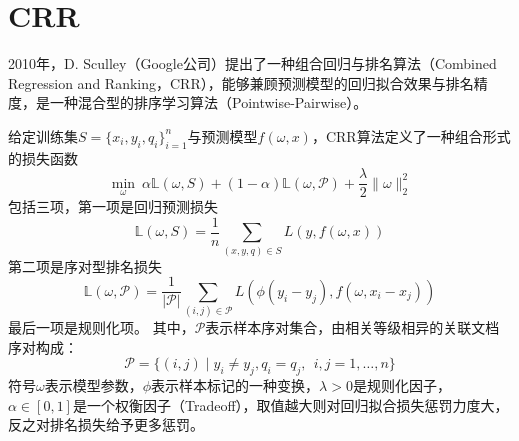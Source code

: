 \section{CRR}
2010年，D. Sculley\cite{sculley2010combined}（Google公司）提出了一种组合回归与排名算法（Combined Regression and Ranking，CRR），能够兼顾预测模型的回归拟合效果与排名精度，是一种混合型的排序学习算法（Pointwise-Pairwise）。

给定训练集$S=\{x_i,y_i,q_i\}_{i=1}^n$与预测模型$f(\omega,x)$，CRR算法定义了一种组合形式的损失函数
\begin{equation}
    \min\limits_{\omega}~\alpha \mathbb{L}(\omega, S) + (1-\alpha) \mathbb{L}(\omega, \mathscr P) + \frac{\lambda}{2} \|\omega\|_2^2
\end{equation}
包括三项，第一项是回归预测损失
\begin{equation}
    \mathbb{L}(\omega, S) = \frac{1}{n} \sum\limits_{(x,y,q)\in S} L(y, f(\omega,x))
\end{equation}
第二项是序对型排名损失
\begin{equation}
    \mathbb{L}(\omega, \mathscr P) = \frac{1}{|\mathscr P|} \sum\limits_{(i,j) \in \mathscr P} L(\phi(y_i-y_j), f(\omega, x_i-x_j))
\end{equation}
最后一项是规则化项。
其中，$\mathscr P$表示样本序对集合，由相关等级相异的关联文档序对构成：
\[
    \mathscr P =\big\{(i,j)\mid y_i\ne y_j, q_i = q_j,~~i,j = 1,\ldots,n\big\}
\]
符号$\omega$表示模型参数，$\phi$表示样本标记的一种变换，$\lambda>0$是规则化因子，$\alpha\in[0,1]$是一个权衡因子（Tradeoff），取值越大则对回归拟合损失惩罚力度大，反之对排名损失给予更多惩罚。

